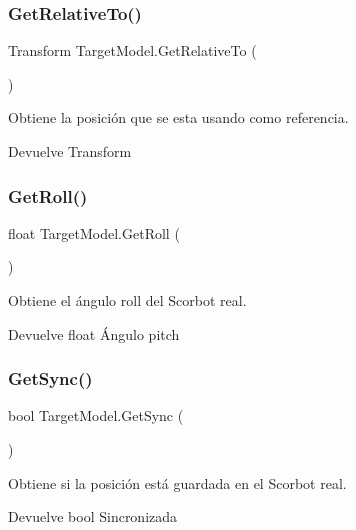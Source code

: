 \subsubsection{\texorpdfstring{GetRelativeTo()}{GetRelativeTo()}}
{\footnotesize\ttfamily Transform Target\+Model.\+Get\+Relative\+To (\begin{DoxyParamCaption}{ }\end{DoxyParamCaption})\hspace{0.3cm}{\ttfamily [inline]}}

Obtiene la posición que se esta usando como referencia. \begin{DoxyReturn}{Devuelve}
Transform 
\end{DoxyReturn}
\mbox{\label{class_target_model_a8cd198c6d6a066183432127e2dc68390}} 
\subsubsection{\texorpdfstring{GetRoll()}{GetRoll()}}
{\footnotesize\ttfamily float Target\+Model.\+Get\+Roll (\begin{DoxyParamCaption}{ }\end{DoxyParamCaption})\hspace{0.3cm}{\ttfamily [inline]}}

Obtiene el ángulo roll del Scorbot real. \begin{DoxyReturn}{Devuelve}
float Ángulo pitch 
\end{DoxyReturn}
\mbox{\label{class_target_model_a6cb8e2993f269328e380670f9b545b80}} 
\subsubsection{\texorpdfstring{GetSync()}{GetSync()}}
{\footnotesize\ttfamily bool Target\+Model.\+Get\+Sync (\begin{DoxyParamCaption}{ }\end{DoxyParamCaption})\hspace{0.3cm}{\ttfamily [inline]}}

Obtiene si la posición está guardada en el Scorbot real. \begin{DoxyReturn}{Devuelve}
bool Sincronizada 
\end{DoxyReturn}
\mbox{\label{class_target_model_a9bb012f5488eb24605440467601f3dfc}} 
